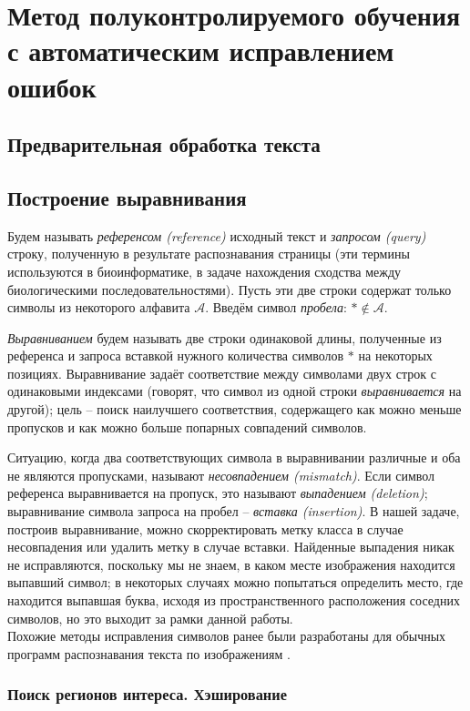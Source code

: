 \documentclass{main.tex}[subfiles]
\begin{document}
\section{Метод полуконтролируемого обучения с автоматическим исправлением ошибок}
\subsection{Предварительная обработка текста}
\subsection{Построение выравнивания}
Будем называть \emph{референсом (reference)} исходный текст и \emph{запросом (query)} строку, полученную в результате распознавания страницы (эти термины используются в биоинформатике, в задаче нахождения сходства между биологическими последовательностями).
Пусть эти две строки содержат только символы из некоторого алфавита $\mathcal A $. Введём символ \emph{пробела}: $ \ast \notin \mathcal A $.

\emph{Выравниванием} будем называть две строки одинаковой длины, полученные из референса и запроса вставкой нужного количества символов $\ast$ на некоторых позициях.
Выравнивание задаёт соответствие между символами двух строк с одинаковыми индексами (говорят, что символ из одной строки \emph{выравнивается} на другой); цель -- поиск наилучшего соответствия, содержащего как можно меньше пропусков и как можно больше попарных совпадений символов.

Ситуацию, когда два соответствующих символа в выравнивании различные и оба не являются пропусками, называют \emph{несовпадением (mismatch)}.
Если символ референса выравнивается на пропуск, это называют \emph{выпадением (deletion)}; выравнивание символа запроса на пробел -- \emph{вставка (insertion)}.
В нашей задаче, построив выравнивание, можно скорректировать метку класса в случае несовпадения или удалить метку в случае вставки.
Найденные выпадения никак не исправляются, поскольку мы не знаем, в каком месте изображения находится выпавший символ; в некоторых случаях можно попытаться определить место, где находится выпавшая буква, исходя из пространственного расположения соседних символов, но это выходит за рамки данной работы. \\

Похожие методы исправления символов ранее были разработаны для обычных программ распознавания текста по изображениям \cite{muller2021word_aln}.

\subsubsection{Поиск регионов интереса. Хэширование}
\end{document}
